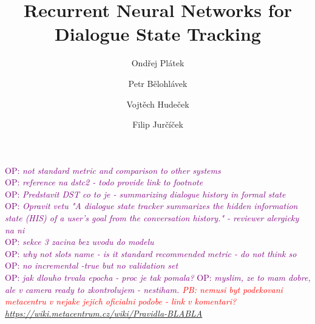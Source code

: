 \documentclass{itatnew}
\def\OP#1{\textcolor{purple}{OP: \textit{#1}}}
\def\PB#1{\textcolor{red}{PB: \textit{#1}}}
\begin{document}
\title{Recurrent Neural Networks for Dialogue State Tracking}

\author{Ondřej Plátek \and Petr Bělohlávek \and Vojtěch Hudeček  \and Filip Jurčíček}


\maketitle              %

\OP{not standard metric and comparison to other systems} \\
\OP{reference na dstc2 - todo provide link to footnote} \\
\OP{Predstavit DST co to je - summarizing dialogue history in formal state} \\
\OP{Opravit vetu "A dialogue state tracker summarizes the hidden information state (HIS)\cite{young2010hidden} of a user's goal from the conversation history." - reviewer alergicky na ni} \\
\OP{sekce 3 zacina bez uvodu do modelu} \\
\OP{why not slots name - is it standard recommended metric - do not think so} \\
\OP{no incremental -true but no validation set} \\

\OP{jak dlouho trvala epocha - proc je tak pomala?}
\OP{myslim, ze to mam dobre, ale v camera ready to zkontrolujem - nestiham. \PB{nemusi byt podekovani metacentru v nejake jejich oficialni podobe - link v komentari?} \url{https://wiki.metacentrum.cz/wiki/Pravidla-BLABLA}}
\end{document}

